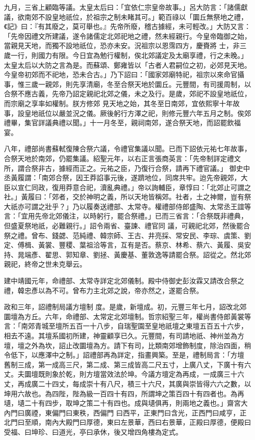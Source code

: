 \begin{pinyinscope}
 九月，三省上顧臨等議。太皇太后曰：「宜依仁宗皇帝故事。」呂大防言：「諸儒獻議，欲南郊不設皇地祇位，於祖宗之制未睹其可。」範百祿以「圜丘無祭地之禮，《記》曰：『有其廢之，莫可舉也。』先帝所廢，稽古據經，未可輕改。」大防又言：「先帝因禮文所建議，遂令諸儒定北郊祀地之禮，然未經親行。今皇帝臨御之始，當親見天地，而獨不設地祇位，恐亦未安。況祖宗以恩霈四方，慶賚將
 士，非三歲一行，則國力有限。今日宜為勉行權制，俟北郊議定及太廟享禮，行之未晚。」太皇太后以大防之言為是。而蘇頌、鄭雍皆以「古者人君嗣位之初，必郊見天地。今皇帝初郊而不祀地，恐未合古。」乃下詔曰：「國家郊廟特祀，祖宗以來命官攝事，惟三歲一親郊，則先享清廟，冬至合祭天地於圜丘。元豐間，有司援周制，以合祭不應古義，先帝乃詔定親祀北郊之儀，未之及行。是歲，郊祀不設皇地祇位，而宗廟之享率如權制。朕方修郊
 見天地之始，其冬至日南郊，宜依熙寧十年故事，設皇地祇位以嚴並況之儀。厥後躬行方澤之祀，則修元豐六年五月之制。俟郊禮畢，集官詳議典禮以聞。」十一月冬至，親祠南郊，遂合祭天地，而詔罷飲福宴。



 八年，禮部尚書蘇軾復陳合祭六議，令禮官集議以聞。已而下詔依元祐七年故事，合祭天地於南郊，仍罷集議。紹聖元年，以右正言張商英言：「先帝制詳定禮文所，謂合祭非古，據經而正之。元祐之臣，乃復行合祭，請再下禮官議。」
 御史中丞黃履謂：「南郊合祭，因王莽諂事元後，遂躋地位，同席共牢。迨先帝親郊，大臣以宣仁同政，復用莽意合祀，瀆亂典禮。」帝以詢輔臣，章惇曰：「北郊止可謂之社。」黃履曰：「郊者，交於神明之義，所以天地皆稱郊。社者，土之神爾，豈有祭大祇亦可謂之壯乎？」乃以履奏送禮部、太常寺。權禮部侍郎盛陶、太常丞王誼等言：「宜用先帝北郊儀注，以時躬行，罷合祭禮。」已而三省言：「合祭既非禮典，但盛夏祭地祇，必難親行。」詔令兩省、臺諫、禮官同
 議，可親祀北郊，然後罷合祭之禮。曾布、錢勰、范純禮、韓宗師、王古、井亮採、常安民、李琮、虞策、劉定、傅楫、黃裳、豐稷、葉祖洽等言，互有是否。蔡京、林希、蔡六、黃履、吳安持、晁端彥、翟思、郭知章、劉拯、黃慶基、董敦逸等請罷合祭。詔從之。然北郊親祀，終帝之世未克舉云。



 建中靖國元年，命禮部、太常寺詳定北郊儀制。殿中侍御史彭汝霖又請改合祭之禮，韓忠彥以為不可。曾布力主北郊之說，帝亦然之，遂罷合祭。



 政和三年，詔禮制局議方壇制
 度。是歲，新壇成。初，元豐三年七月，詔改北郊圜壇為方丘。六年，命禮部、太常定北郊壇制。哲宗紹聖三年，權尚書侍郎黃裳等言：「南郊青城至壇所五百一十八步，自瑞聖園至皇地祇壇之東壇五百五十六步，相去不遠。其壇系國初所建，神靈顧享已久。元豐間，有司請地祇、神州並為方壇，壇之外為坎，詔止改圜壇為方。請下有司，比類南郊增飾制度，除治四面，稍令低下，以應澤中之制。」詔禮部再為詳定，指畫興築。至是，禮制局言：「方壇
 舊制三成，第一成高三尺，第二成、第三成皆高二尺五寸，上廣八丈，下廣十有六丈。夫圜壇既則象於乾，則方壇當效法於坤。今議方壇定為再成，一成廣三十六丈，再成廣二十四丈，每成崇十有八尺，積三十六尺，其廣與崇皆得六六之數，以坤用六故也。為四陛，陛為級一百四十有四，所謂坤之策百四十有四者也。為再壝，壝二十有四步，取坤之策二十有四也。成與壝俱再，則兩地之義也。」齋宮大內門曰廣禋，東偏門曰東秩，西偏門
 曰西平，正東門曰含光，正西門曰咸亨，正北門曰至順，南內大殿門曰厚德，東曰左景華，西曰右景華，正殿曰厚德，便殿曰受福、曰坤珍、曰道光，亭曰承休，後又增四角樓為定式。




\end{pinyinscope}
